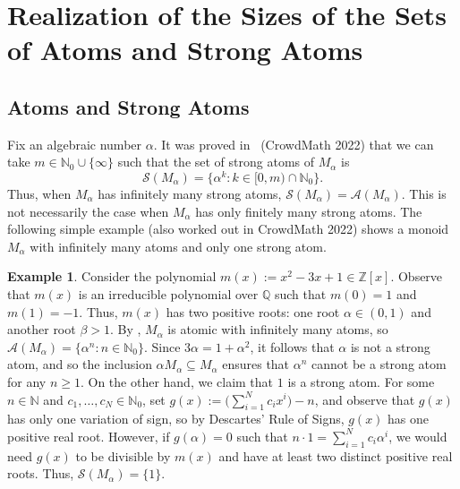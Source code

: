 \documentclass[11pt]{amsart}
\theoremstyle{definition}
\newtheorem{example}[theorem]{Example}
\theoremstyle{remark}
\numberwithin{equation}{section}
\newcommand{\nn}{\mathbb{N}}
\newcommand{\qq}{\mathbb{Q}}
\newcommand{\zz}{\mathbb{Z}}
\begin{document}

\bigskip
\section{Realization of the Sizes of the Sets of Atoms and Strong Atoms}

\medskip

\subsection{Atoms and Strong Atoms} 

Fix an algebraic number $\alpha$. It was proved in~\cite{AGS25} (CrowdMath 2022) that we can take $m \in \nn_0 \cup \{\infty\}$ such that the set of strong atoms of $M_\alpha$ is
\begin{equation}
    \mathcal{S}(M_\alpha) = \big\{ \alpha^k : k \in [0,m) \cap \nn_0 \big\}.
\end{equation}
Thus, when $M_\alpha$ has infinitely many strong atoms, $\mathcal{S}(M_\alpha) = \mathcal{A}(M_\alpha)$. This is not necessarily the case when $M_\alpha$ has only finitely many strong atoms. The following simple example (also worked out in CrowdMath 2022) shows a monoid~$M_\alpha$ with infinitely many atoms and only one strong atom.

\begin{example} \label{ex:one strong atom}
    Consider the polynomial $m(x) := x^2 - 3x + 1 \in \zz[x]$. Observe that $m(x)$ is an irreducible polynomial over $\qq$ such that $m(0) = 1$ and $m(1) = -1$. Thus, $m(x)$ has two positive roots: one root $\alpha \in (0,1)$ and another root $\beta > 1$. By , $M_\alpha$ is atomic with infinitely many atoms, so $\mathcal{A}(M_\alpha) = \{\alpha^n : n \in \nn_0\}$. Since $3 \alpha = 1 + \alpha^2$, it follows that $\alpha$ is not a strong atom, and so the inclusion $\alpha M_\alpha \subseteq M_\alpha$ ensures that $\alpha^n$ cannot be a strong atom for any $n \ge 1$. On the other hand, we claim that $1$ is a strong atom. For some $n \in \nn$ and $c_1, \dots, c_N \in \nn_0$, set $g(x) := \big( \sum_{i=1}^N c_i x^i \big) - n$, and observe that $g(x)$ has only one variation of sign, so by Descartes' Rule of Signs, $g(x)$ has one positive real root. However, if $g(\alpha)=0$ such that $n \cdot 1 = \sum_{i=1}^N c_i \alpha^i$, we would need $g(x)$ to be divisible by $m(x)$ and have at least two distinct positive real roots. Thus, $\mathcal{S}(M_\alpha) = \{1\}$.
\end{example}
\end{document}
